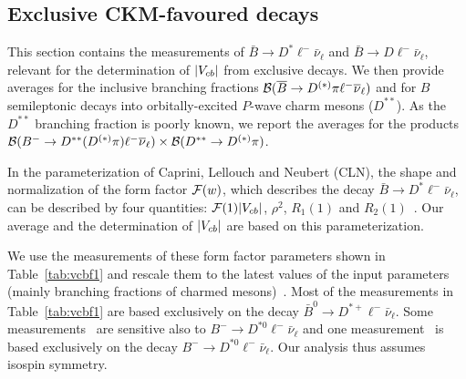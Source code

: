 \subsection{Exclusive CKM-favoured decays}
\label{slbdecays_b2cexcl}
This section contains the measurements of $\bar B\to
D^*\ell^-\bar\nu_\ell$ and $\bar B\to D\ell^-\bar\nu_\ell$, relevant
for the determination of $|V_{cb}|$ from exclusive decays. We then provide
averages for the inclusive branching fractions $\cbf(\bar B\to
D^{(*)}\pi \ell^-\bar\nu_\ell)$ and for $B$ semileptonic decays into
orbitally-excited $P$-wave charm mesons ($D^{**}$). As the $D^{**}$
branching fraction is poorly known, we report the averages for the products 
$\cbf(B^-\to D^{**}(D^{(*)}\pi)\ell^-\bar\nu_\ell)\times
\cbf(D^{**}\to D^{(*)}\pi)$.


\label{slbdecays_dstarlnu}

In the parameterization of Caprini, Lellouch and Neubert
(CLN), the shape and normalization of the form factor ${\cal F}(w)$, which describes
the decay $\bar B\to D^*\ell^-\bar\nu_\ell$, can be described by four
quantities: ${\cal F}(1)|V_{cb}|$, $\rho^2$, $R_1(1)$ and
$R_2(1)$~\cite{CLN}. Our average and the determination of $|V_{cb}|$ are
based on this parameterization.

We use the measurements of these form factor parameters shown in
Table~\ref{tab:vcbf1} and rescale them to the latest values of the
input parameters (mainly branching fractions of charmed
mesons)~\cite{HFAG_sl:inputparams}. Most of the measurements in
Table~\ref{tab:vcbf1} are based exclusively on the decay $\bar B^0\to
D^{*+}\ell^-\bar\nu_\ell$. Some
measurements~\cite{Adam:2002uw,Aubert:2009_1} are sensitive also to
$B^-\to D^{*0}\ell^-\bar\nu_\ell$ and one
measurement~\cite{Aubert:2009_3} is based exclusively on the decay
$B^-\to D^{*0}\ell^-\bar\nu_\ell$. Our analysis thus assumes isospin
symmetry.


